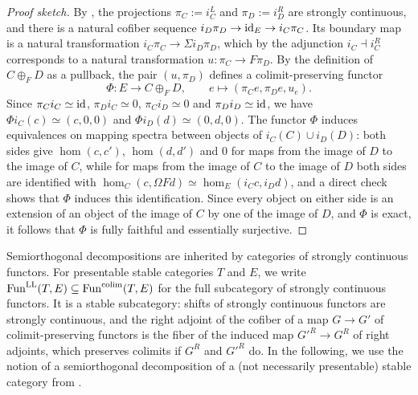 	\begin{proof}[Proof sketch]
		By , the projections $\pi_C := i_C^L$ and $\pi_D := i_D^R$ are strongly continuous, and there is a natural cofiber sequence $i_D\pi_D \to \operatorname{id}_E \to i_C\pi_C$. Its boundary map is a natural transformation $i_C\pi_C \to \Sigma i_D\pi_D$, which by the adjunction $i_C \dashv i_C^R$ corresponds to a natural transformation $u\colon \pi_C \to F\pi_D$. By the definition of $C \oplus_F D$ as a pullback, the pair $(u,\pi_D)$ defines a colimit-preserving functor
		\[
			\Phi\colon E \to C \oplus_F D, \qquad e \mapsto (\pi_Ce,\pi_De,u_e).
		\]
		Since $\pi_Ci_C \simeq \operatorname{id}$, $\pi_Di_C \simeq 0$, $\pi_Ci_D \simeq 0$ and $\pi_Di_D \simeq \operatorname{id}$, we have $\Phi i_C(c) \simeq (c,0,0)$ and $\Phi i_D(d) \simeq (0,d,0)$. The functor $\Phi$ induces equivalences on mapping spectra between objects of $i_C(C) \cup i_D(D)$: both sides give $\hom(c,c')$, $\hom(d,d')$ and $0$ for maps from the image of $D$ to the image of $C$, while for maps from the image of $C$ to the image of $D$ both sides are identified with $\hom_C(c,\Omega Fd) \simeq \hom_E(i_Cc,i_Dd)$, and a direct check shows that $\Phi$ induces this identification. Since every object on either side is an extension of an object of the image of $C$ by one of the image of $D$, and $\Phi$ is exact, it follows that $\Phi$ is fully faithful and essentially surjective.
	\end{proof}

	Semiorthogonal decompositions are inherited by categories of strongly continuous functors. For presentable stable categories $T$ and $E$, we write $\operatorname{Fun}^{\mathrm{LL}}(T,E) \subseteq \operatorname{Fun}^{\operatorname{colim}}(T,E)$ for the full subcategory of strongly continuous functors. It is a stable subcategory: shifts of strongly continuous functors are strongly continuous, and the right adjoint of the cofiber of a map $G \to G'$ of colimit-preserving functors is the fiber of the induced map $G'^R \to G^R$ of right adjoints, which preserves colimits if $G^R$ and $G'^R$ do. In the following, we use the notion of a semiorthogonal decomposition of a (not necessarily presentable) stable category from .

